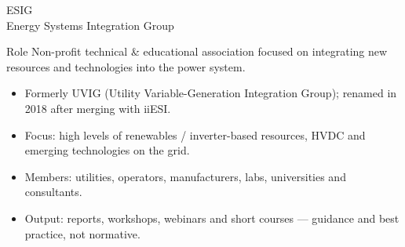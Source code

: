 \begin{frame}{ESIG\\Energy Systems Integration Group}
  \begin{block}{Role}
    Non-profit technical \& educational association focused on integrating
    new resources and technologies into the power system.
  \end{block}
  \vspace{0.3em}
  \begin{itemize}
    \setlength{\itemsep}{0.4em}
    \item Formerly UVIG (Utility Variable-Generation Integration Group); renamed in 2018 after merging with iiESI.
    \item Focus: high levels of renewables / inverter-based resources, HVDC and emerging technologies on the grid.
    \item Members: utilities, operators, manufacturers, labs, universities and consultants.
    \item Output: reports, workshops, webinars and short courses — guidance and best practice, not normative.
  \end{itemize}
\end{frame}

